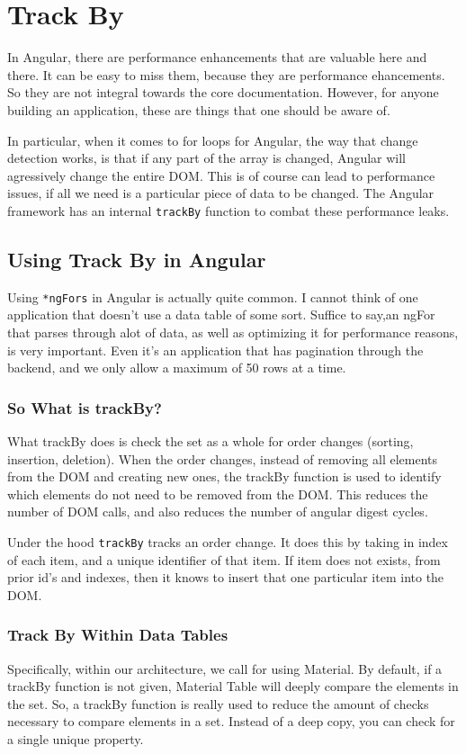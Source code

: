 \chapter{ Track By }
In Angular, there are performance enhancements that are valuable here and there.
It can be easy to miss them, because they are performance ehancements. So they are not integral towards the core documentation. However, for anyone building an application, these are things that one should be aware of. 

In particular, when it comes to for loops for Angular, the way that change detection works, is that if any part of the array is changed, Angular will agressively change the entire DOM. This is of course can lead to performance issues, if all we need is a particular piece of data to be changed. The Angular framework has an internal \lstinline{trackBy} function to combat these performance leaks. 

\section{ Using Track By in Angular }
Using \lstinline{*ngFors} in Angular is actually quite common. I cannot think of one application that doesn't use a data table of some sort. Suffice to say,an ngFor that parses through alot of data, as well as optimizing it for
performance reasons, is very important. Even it's an application that has pagination through the backend, and we only allow a maximum of 50 rows at a time.

\subsection{ So What is trackBy?}
What trackBy does is check the set as a whole for order changes (sorting,
insertion, deletion). When the order changes, instead of removing all elements
from the DOM and creating new ones, the trackBy function is used to identify
which elements do not need to be removed from the DOM. This reduces the number
of DOM calls, and also reduces the number of angular digest cycles.

Under the hood \lstinline{trackBy} tracks an order change. It does this by taking in index of each item, and a unique identifier of that item. If item does not exists, from prior id's and indexes, then it knows to insert that one particular item into the DOM. 

\subsection{ Track By Within Data Tables }
Specifically, within our architecture, we call for using Material. By default,
if a trackBy function is not given, Material Table will deeply compare the
elements in the set. So, a trackBy function is really used to reduce the amount
of checks necessary to compare elements in a set. Instead of a deep copy, you
can check for a single unique property.

